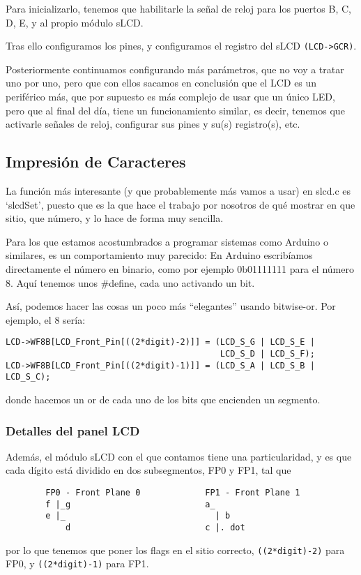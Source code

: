 \documentclass[a4paper,openright,12pt]{article}
\begin{document}
Para inicializarlo, tenemos que habilitarle la señal de reloj para los puertos B, C, D, E, y al propio módulo sLCD.

Tras ello configuramos los pines, y configuramos el registro del sLCD \texttt{(LCD->GCR)}.

Posteriormente continuamos configurando más parámetros, que no voy a tratar uno por uno, pero que con ellos sacamos en conclusión que el LCD es un periférico más, que por
supuesto es más complejo de usar que un único LED, pero que al final del día, tiene un funcionamiento similar, es decir, tenemos que activarle señales de reloj, configurar
sus pines y su(s) registro(s), etc.

\subsection{Impresión de Caracteres}
La función más interesante (y que probablemente más vamos a usar) en slcd.c es `slcdSet', puesto que es la que hace el trabajo por nosotros de qué mostrar en que sitio,
que número, y lo hace de forma muy sencilla.

Para los que estamos acostumbrados a programar sistemas como Arduino o similares, es un comportamiento muy parecido: En Arduino escribíamos directamente el número en binario,
como por ejemplo 0b01111111 para el número 8. Aquí tenemos unos \#define, cada uno activando un bit.

Así, podemos hacer las cosas un poco más ``elegantes'' usando bitwise-or. Por ejemplo, el 8 sería:

\begin{verbatim}
LCD->WF8B[LCD_Front_Pin[((2*digit)-2)]] = (LCD_S_G | LCD_S_E |
                                           LCD_S_D | LCD_S_F);
LCD->WF8B[LCD_Front_Pin[((2*digit)-1)]] = (LCD_S_A | LCD_S_B | LCD_S_C);
\end{verbatim}
donde hacemos un or de cada uno de los bits que encienden un segmento.

\subsubsection{Detalles del panel LCD}
Además, el módulo sLCD con el que contamos tiene una particularidad, y es que cada dígito está dividido en dos subsegmentos, FP0 y FP1, tal que

\begin{samepage}
\begin{verbatim}
        FP0 - Front Plane 0             FP1 - Front Plane 1
        f |_g                           a_
        e |_                              | b
            d                           c |. dot
\end{verbatim}
\end{samepage}
por lo que tenemos que poner los flags en el sitio correcto, \texttt{((2*digit)-2)} para FP0, y \texttt{((2*digit)-1)} para FP1.
\end{document}
